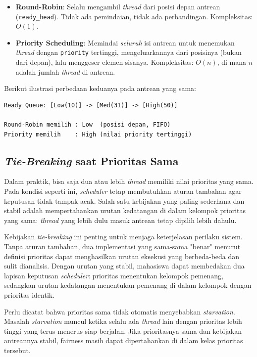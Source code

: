 \begin{itemize}
	\item \textbf{Round-Robin}: Selalu mengambil \textit{thread} dari posisi depan antrean (\texttt{ready\_head}). Tidak ada pemindaian, tidak ada perbandingan. Kompleksitas: $O(1)$.
	\item \textbf{Priority Scheduling}: Memindai \textit{seluruh} isi antrean untuk menemukan \textit{thread} dengan \texttt{priority} tertinggi, mengeluarkannya dari posisinya (bukan dari depan), lalu menggeser elemen sisanya. Kompleksitas: $O(n)$, di mana $n$ adalah jumlah \textit{thread} di antrean.
\end{itemize}

Berikut ilustrasi perbedaan keduanya pada antrean yang sama:

\begin{lstlisting}[caption={Ilustrasi perbedaan pemilihan thread}]
Ready Queue: [Low(10)] -> [Med(31)] -> [High(50)]

Round-Robin memilih : Low  (posisi depan, FIFO)
Priority memilih    : High (nilai priority tertinggi)
\end{lstlisting}

\subsection{\textit{Tie-Breaking} saat Prioritas Sama}
Dalam praktik, bisa saja dua atau lebih \textit{thread} memiliki nilai prioritas yang sama. Pada kondisi seperti ini, \textit{scheduler} tetap membutuhkan aturan tambahan agar keputusan tidak tampak acak. Salah satu kebijakan yang paling sederhana dan stabil adalah mempertahankan urutan kedatangan di dalam kelompok prioritas yang sama: \textit{thread} yang lebih dulu masuk antrean tetap dipilih lebih dahulu.

Kebijakan \textit{tie-breaking} ini penting untuk menjaga keterjelasan perilaku sistem. Tanpa aturan tambahan, dua implementasi yang sama-sama "benar" menurut definisi prioritas dapat menghasilkan urutan eksekusi yang berbeda-beda dan sulit dianalisis. Dengan urutan yang stabil, mahasiswa dapat membedakan dua lapisan keputusan \textit{scheduler}: prioritas menentukan kelompok pemenang, sedangkan urutan kedatangan menentukan pemenang di dalam kelompok dengan prioritas identik.

Perlu dicatat bahwa prioritas sama tidak otomatis menyebabkan \textit{starvation}. Masalah \textit{starvation} muncul ketika selalu ada \textit{thread} lain dengan prioritas lebih tinggi yang terus-menerus siap berjalan. Jika prioritasnya sama dan kebijakan antreannya stabil, fairness masih dapat dipertahankan di dalam kelas prioritas tersebut.

